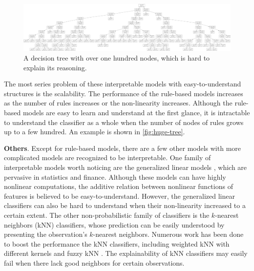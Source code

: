\begin{figure}[tb]
  \centering
  \includegraphics[width=1.0\textwidth]{figure/huge-tree}
  \caption[A decision tree with over one hundred nodes, which is hard to explain its reasoning.]{A decision tree with over one hundred nodes, which is hard to explain its reasoning\footnotemark.}
  \label{fig:huge-tree}
\end{figure}

The most series problem of these interpretable models with easy-to-understand structures is the scalability. The performance of the rule-based models increases as the number of rules increases or the non-linearity increases. Although the rule-based models are easy to learn and understand at the first glance, it is intractable to understand the classifier as a whole when the number of nodes of rules grows up to a few hundred. An example is shown in \autoref{fig:huge-tree}.

\textbf{Others}. Except for rule-based models, there are a few other models with more complicated models are recognized to be interpretable.
One family of interpretable models worth noticing are the generalized linear models \cite{debock2010gam}, which are pervasive in statistics and finance. Although these models can have highly nonlinear computations, the additive relation between nonlinear functions of features is believed to be easy-to-understand. However, the generalized linear classifiers can also be hard to understand when their non-linearity increased to a certain extent. The other non-probabilistic family of classifiers is the $k$-nearest neighbors (kNN) classifiers, whose prediction can be easily understood by presenting the observation's $k$-nearest neighbors. Numerous work has been done to boost the performance the kNN classifiers, including weighted kNN with different kernels \cite{dudani1976weightedknn} and fuzzy kNN \cite{keller1985fuzzyknn}. The explainability of kNN classifiers may easily fail when there lack good neighbors for certain observations.


